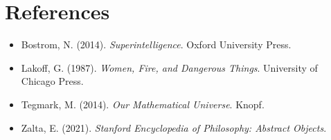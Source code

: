 \documentclass[11pt]{article}
\begin{document}
\section{References}

\begin{itemize}
  \item Bostrom, N. (2014). \textit{Superintelligence}. Oxford University Press.
  \item Lakoff, G. (1987). \textit{Women, Fire, and Dangerous Things}. University of Chicago Press.
  \item Tegmark, M. (2014). \textit{Our Mathematical Universe}. Knopf.
  \item Zalta, E. (2021). \textit{Stanford Encyclopedia of Philosophy: Abstract Objects}.
\end{itemize}
\end{document}
